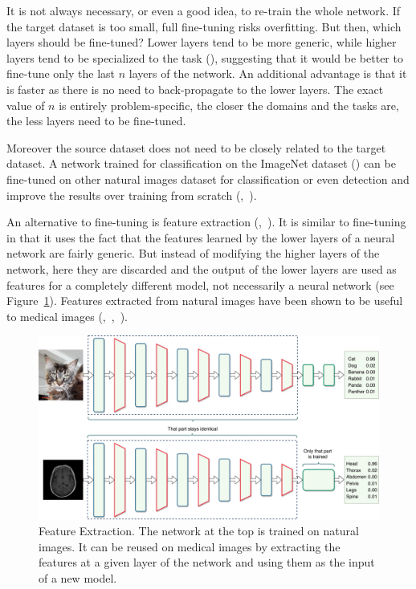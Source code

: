 It is not always necessary, or even a good idea, to re-train the whole network. If the target dataset is too small, full fine-tuning risks overfitting. But then, which layers should be fine-tuned? Lower layers tend to be more generic, while higher layers tend to be specialized to the task (\textcite{yosinski2014NIPS}), suggesting that it would be better to fine-tune only the last $n$ layers of the network. An additional advantage is that it is faster as there is no need to back-propagate to the lower layers. The exact value of $n$ is entirely problem-specific, the closer the domains and the tasks are, the less layers need to be fine-tuned.

Moreover the source dataset does not need to be closely related to the target dataset. A network trained for classification on the ImageNet dataset (\textcite{imagenet}) can be fine-tuned on other natural images dataset for classification or even detection and improve the results over training from scratch (\textcite{oquab2014CVPR},~\textcite{razavian2014CVPR}).

An alternative to fine-tuning is feature extraction (\textcite{donahue14PMLR},~\textcite{sermanet2014ICLR}). It is similar to fine-tuning in that it uses the fact that the features learned by the lower layers of a neural network are fairly generic. But instead of modifying the higher layers of the network, here they are discarded and the output of the lower layers are used as features for a completely different model, not necessarily a neural network (see Figure~\ref{fig:feature_extraction}). Features extracted from natural images have been shown to be useful to medical images (\textcite{shin2016},~\textcite{bar2015ISBI},~\textcite{vanginneken2015ISBI}).

\begin{figure}[ht]
    \centering
	\includegraphics[width=\textwidth]{latex/img_transfer/feature_extraction.pdf}
    \caption{Feature Extraction. The network at the top is trained on natural images. It can be reused on medical images by extracting the features at a given layer of the network and using them as the input of a new model.}
    \label{fig:feature_extraction}
\end{figure}

